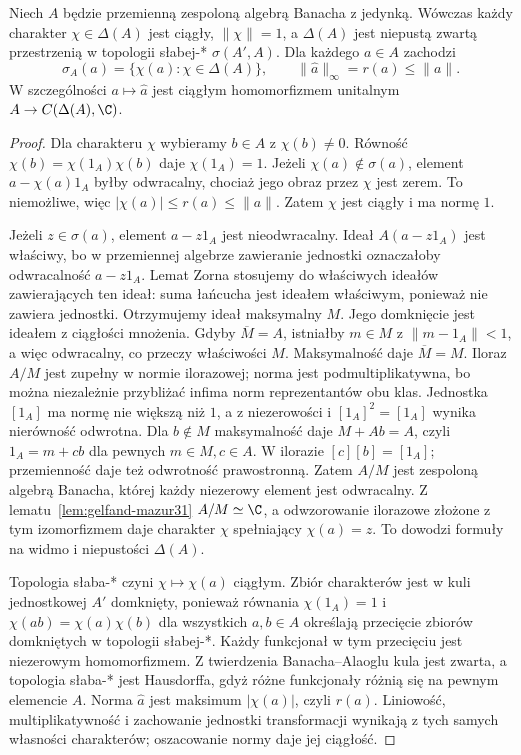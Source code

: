 \begin{twierdzenie}
\label{thm:gelfand-spectrum31}
Niech $A$ będzie przemienną zespoloną algebrą Banacha z jedynką.
Wówczas każdy charakter $\chi\in\Delta(A)$ jest ciągły,
$\|\chi\|=1$, a $\Delta(A)$ jest niepustą zwartą przestrzenią
w topologii słabej-* $\sigma(A',A)$. Dla każdego $a\in A$ zachodzi
\[
 \sigma_A(a)=\{\chi(a):\chi\in\Delta(A)\},\qquad
 \|\widehat a\|_\infty=r(a)\le\|a\|.
\]
W szczególności $a\mapsto\widehat a$ jest ciągłym homomorfizmem
unitalnym $A\to C(\Delta(A),\C)$.
\end{twierdzenie}
\begin{proof}
Dla charakteru $\chi$ wybieramy $b\in A$ z $\chi(b)\ne0$.
Równość $\chi(b)=\chi(1_A)\chi(b)$ daje $\chi(1_A)=1$.
Jeżeli $\chi(a)\notin\sigma(a)$, element $a-\chi(a)1_A$
byłby odwracalny, chociaż jego obraz przez $\chi$ jest zerem.
To niemożliwe, więc $|\chi(a)|\le r(a)\le\|a\|$.
Zatem $\chi$ jest ciągły i ma normę $1$.

Jeżeli $z\in\sigma(a)$, element $a-z1_A$ jest nieodwracalny.
Ideał $A(a-z1_A)$ jest właściwy, bo w przemiennej
algebrze zawieranie jednostki oznaczałoby odwracalność
$a-z1_A$. Lemat Zorna stosujemy do właściwych ideałów
zawierających ten ideał: suma łańcucha jest ideałem
właściwym, ponieważ nie zawiera jednostki. Otrzymujemy
ideał maksymalny $M$. Jego domknięcie jest ideałem
z ciągłości mnożenia. Gdyby $\overline M=A$, istniałby
$m\in M$ z $\|m-1_A\|<1$, a więc odwracalny, co przeczy
właściwości $M$. Maksymalność daje $\overline M=M$.
Iloraz $A/M$ jest zupełny w normie ilorazowej; norma
jest podmultiplikatywna, bo można niezależnie przybliżać
infima norm reprezentantów obu klas. Jednostka $[1_A]$
ma normę nie większą niż $1$, a z niezerowości i
$[1_A]^2=[1_A]$ wynika nierówność odwrotna.
Dla $b\notin M$ maksymalność daje $M+Ab=A$, czyli
$1_A=m+cb$ dla pewnych $m\in M,c\in A$.
W ilorazie $[c][b]=[1_A]$; przemienność daje też
odwrotność prawostronną. Zatem $A/M$ jest zespoloną
algebrą Banacha, której każdy niezerowy element jest odwracalny. Z lematu~\ref{lem:gelfand-mazur31}
$A/M\simeq\C$, a odwzorowanie ilorazowe złożone z tym
izomorfizmem daje charakter $\chi$ spełniający $\chi(a)=z$.
To dowodzi formuły na widmo i niepustości $\Delta(A)$.

Topologia słaba-* czyni $\chi\mapsto\chi(a)$ ciągłym.
Zbiór charakterów jest w kuli jednostkowej $A'$ domknięty,
ponieważ równania $\chi(1_A)=1$ i
$\chi(ab)=\chi(a)\chi(b)$ dla wszystkich $a,b\in A$
określają przecięcie zbiorów domkniętych w topologii
słabej-*. Każdy funkcjonał w tym przecięciu jest
niezerowym homomorfizmem. Z twierdzenia Banacha--Alaoglu
kula jest zwarta, a topologia słaba-* jest Hausdorffa,
gdyż różne funkcjonały różnią się na pewnym elemencie $A$.
Norma $\widehat a$ jest maksimum $|\chi(a)|$, czyli $r(a)$.
Liniowość, multiplikatywność i zachowanie jednostki
transformacji wynikają z tych samych własności charakterów;
oszacowanie normy daje jej ciągłość.
\end{proof}

